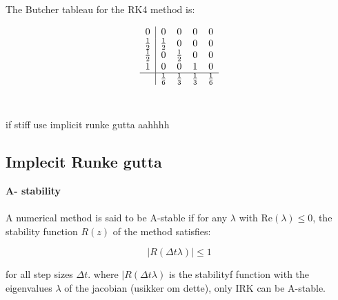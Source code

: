 The Butcher tableau for the RK4 method is:

\[
\begin{array}{c|cccc}
0 & 0 & 0 & 0 & 0 \\
\frac{1}{2} & \frac{1}{2} & 0 & 0 & 0 \\
\frac{1}{2} & 0 & \frac{1}{2} & 0 & 0 \\
1 & 0 & 0 & 1 & 0 \\
\hline
 & \frac{1}{6} & \frac{1}{3} & \frac{1}{3} & \frac{1}{6} \\
\end{array}
\]
\\
\\
if stiff use implicit runke gutta aahhhh


\subsection{Implecit Runke gutta}
\textbf{A- stability}
\\
\\
A numerical method is said to be A-stable if for any \(\lambda\) with \(\text{Re}(\lambda) \leq 0\), the stability function \(R(z)\) of the method satisfies:

\[
|R(\Delta t \lambda)| \leq 1
\]

for all step sizes \(\Delta t\). where  $|R(\Delta t \lambda)$ is the stabilityf function with the eigenvalues $\lambda$  of the jacobian (usikker om dette), only IRK can be A-stable.